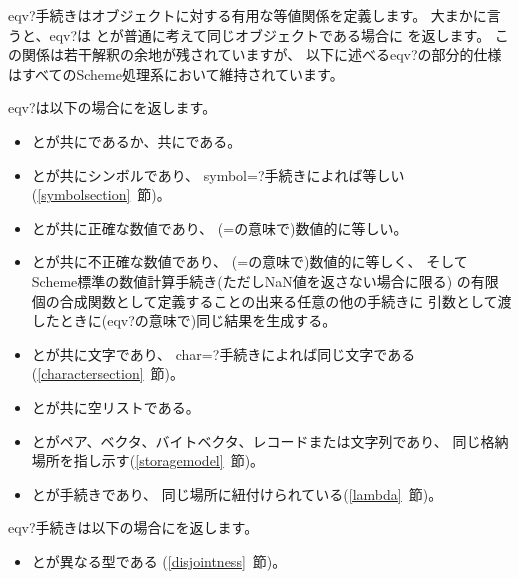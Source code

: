 \begin{entry}{%
}

{\cf eqv?}手続きはオブジェクトに対する有用な等値関係を定義します。
大まかに言うと、{\cf eqv?}は
とが普通に考えて同じオブジェクトである場合に
\schtrue{}を返します。
この関係は若干解釈の余地が残されていますが、
以下に述べる{\cf eqv?}の部分的仕様はすべてのScheme処理系において維持されています。


{\cf eqv?}は以下の場合に\schtrue{}を返します。

\begin{itemize}
\item {}とが共に\schtrue{}であるか、共に\schfalse{}である。

\item {}とが共にシンボルであり、
{\cf symbol=?}手続きによれば等しい(\ref{symbolsection}~節)。

\item {}とが共に正確な数値であり、
({\cf =}の意味で)数値的に等しい。

\item {}とが共に不正確な数値であり、
({\cf =}の意味で)数値的に等しく、
そしてScheme標準の数値計算手続き(ただしNaN値を返さない場合に限る)
の有限個の合成関数として定義することの出来る任意の他の手続きに
引数として渡したときに({\cf eqv?}の意味で)同じ結果を生成する。

\item {}とが共に文字であり、
{\cf char=?}手続きによれば同じ文字である(\ref{charactersection}~節)。

\item {}とが共に空リストである。

\item {}とがペア、ベクタ、バイトベクタ、レコードまたは文字列であり、
同じ格納場所を指し示す(\ref{storagemodel}~節)。

\item {}とが手続きであり、
同じ場所に紐付けられている(\ref{lambda}~節)。
\end{itemize}

{\cf eqv?}手続きは以下の場合に\schfalse{}を返します。

\begin{itemize}
\item {}とが異なる型である
(\ref{disjointness}~節)。


\end{itemize}
\end{entry}
